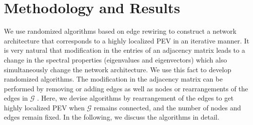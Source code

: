 \documentclass[envcountreset,oribibl]{llncs}
\begin{document}
\section{Methodology and Results}
We use randomized algorithms based on edge rewiring to construct a network architecture that corresponds to a highly localized PEV in an iterative manner. It is very natural that modification in the entries of an adjacency matrix leads to a change in the spectral properties (eigenvalues and eigenvectors) which also simultaneously change the network architecture. We use this fact to develop randomized algorithms. The modification in the adjacency matrix can be performed by removing or adding edges as well as nodes or rearrangements of the edges in $\mathcal{G}$ \cite{evec_localization_2017}. Here, we devise algorithms by rearrangement of the edges to get highly localized PEV when $\mathcal{G}$ remains connected, and the number of nodes and edges remain fixed. In the following, we discuss the algorithms in detail.
\end{document}
